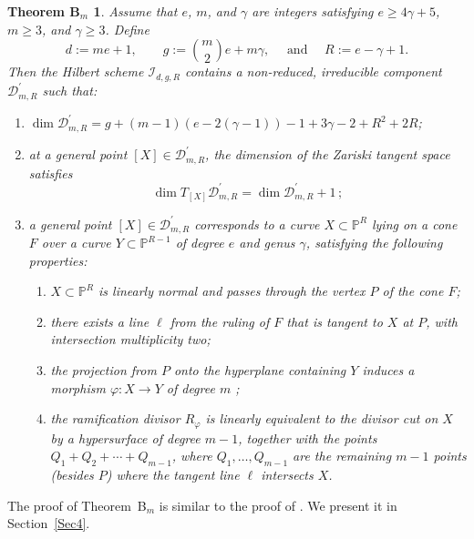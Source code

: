 \documentclass[a4paper,12pt]{amsart}
\newtheorem*{thmBm}{Theorem B$_m$}
\def\dim{\operatorname{dim}}
\begin{document}
\begin{thmBm}
Assume that $e$, $m$, and $\gamma$ are integers satisfying $e \geq 4 \gamma +5$, $m \geq 3$, and $\gamma \geq 3$. Define
\[
  d:= me + 1 , \qquad  g := \binom{m}{2} e + m \gamma , \quad \mbox{ and } \quad R:= e - \gamma + 1 .
\]
Then the Hilbert scheme $\mathcal{I}_{d, g, R}$ contains a \emph{non-reduced}, irreducible component $\mathcal{D}^{\prime}_{m,R}$ such that:
\begin{enumerate}[label=(\roman*), leftmargin=*, font=\rmfamily]
  \item $\dim \mathcal{D}^{\prime}_{m,R} = g + (m-1)(e - 2(\gamma-1)) - 1 + 3\gamma-2 + R^2 + 2R$;

  \item at a general point $[X] \in \mathcal{D}^{\prime}_{m,R}$, the dimension of the Zariski tangent space satisfies
 \[
  \dim T_{[X]} \mathcal{D}^{\prime}_{m,R} = \dim \mathcal{D}^{\prime}_{m,R} + 1 \, ;
 \]

  \item a general point $[X] \in \mathcal{D}^{\prime}_{m,R}$ corresponds to a curve $X \subset \mathbb{P}^R$ lying on a cone $F$ over a curve $Y \subset \mathbb{P}^{R-1}$ of degree $e$ and genus $\gamma$, satisfying the following properties:
  \begin{enumerate}[label=\theenumi.\arabic*.]
   \item $X \subset \mathbb{P}^{R}$ is linearly normal and passes through the vertex $P$ of the cone $F$;

   \item there exists a line $\ell$ from the ruling of $F$ that is tangent to $X$ at $P$, with intersection multiplicity two;

   \item the projection from $P$ onto the hyperplane containing $Y$ induces a morphism $\varphi : X \to Y$ of degree $m$ ;

   \item the ramification divisor $R_{\varphi}$ is linearly equivalent to the divisor cut on $X$ by a hypersurface of degree $m-1$, together with the points $Q_1 + Q_2 + \cdots + Q_{m-1}$, where $Q_1, \ldots , Q_{m-1}$ are the remaining $m-1$ points (besides $P$) where the tangent line $\ell$ intersects $X$.
  \end{enumerate}
\end{enumerate}
\end{thmBm}

\medskip

The proof of \textnormal{Theorem~B$_m$} is similar to the proof of \cite[The Main Theorem]{CIK24b}. We present it in \textnormal{Section~\ref{Sec4}}.
\end{document}
